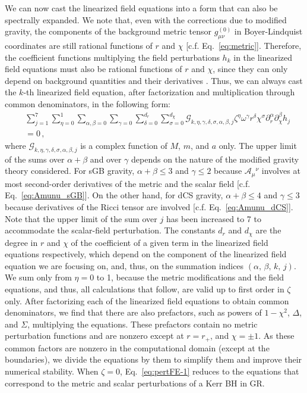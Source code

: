 \documentclass[aps,prx,amsmath,floats,floatfix,twocolumn,
  superscriptaddress,nofootinbib,showpacs]{revtex4-1}
\begin{document}
We can now cast the linearized field equations into a form that can also be spectrally expanded. 
We note that, even with the corrections due to modified gravity, the components of the background metric tensor $g_{\mu\nu}^{(0)}$ in Boyer-Lindquist coordinates are still rational functions of $r$ and $\chi$ [c.f. Eq.~\eqref{eq:metric}]. 
Therefore, the coefficient functions multiplying the field perturbations $h_k$ in the linearized field equations must also be rational functions of $r$ and $\chi$, since they can only depend on background quantities and their derivatives \cite{Chung:2023wkd, Chung:2023zdq}. 
Thus, we can always cast the $k$-th linearized field equation, after factorization and multiplication through common denominators, in the following form: 
%
\begin{align}\label{eq:pertFE-1}
& \sum_{j=1}^{7} \sum_{\eta = 0}^{1} \sum_{\alpha, \beta = 0} \sum_{\gamma=0} \sum_{\delta=0}^{d_{r}} \sum_{\sigma=0}^{d_{\chi}} \mathcal{G}_{k, \eta, \gamma, \delta, \sigma, \alpha, \beta, j} \zeta^{\eta} \omega^\gamma r^{\delta} \chi^{\sigma} \partial_{r}^{\alpha} \partial_{\chi}^{\beta} h_j 
\nonumber \\
&= 0 \,,
\end{align}
where $\mathcal{G}_{k, \eta, \gamma, \delta, \sigma, \alpha, \beta, j}$ is a complex function of $M$, $m$, and $a$ only.
The upper limit of the sums over $\alpha+\beta$ and over $\gamma$ depends on the nature of the modified gravity theory considered. 
For sGB gravity, $\alpha+\beta \leq 3 $ and $\gamma \leq 2 $ because $\mathscr{A}_{\mu} {}^{\nu}$ involves at most second-order derivatives of the metric and the scalar field [c.f. Eq.~\eqref{eq:Amunu_sGB}]. 
On the other hand, for dCS gravity, $\alpha+\beta \leq 4 $ and $\gamma \leq 3 $ because derivatives of the Ricci tensor are involved [c.f. Eq.~\eqref{eq:Amunu_dCS}]. 
Note that the upper limit of the sum over $j$ has been increased to 7 to accommodate the scalar-field perturbation. 
The constants $d_r$ and $d_\chi$ are the degree in $r$ and $\chi$ of the coefficient of a given term in the linearized field equations respectively, which depend on the component of the linearized field equation we are focusing on, and, thus, on the summation indices $(\alpha,\, \beta, \, k, \, j)$. 
We sum only from $\eta = 0 $ to 1, because the metric modifications and the field equations, and thus, all calculations that follow, are valid up to first order in $\zeta$ only. 
After factorizing each of the linearized field equations to obtain common denominators, we find that there are also prefactors, such as powers of $1-\chi^2$, $\Delta$, and $\Sigma$, multiplying the equations.
These prefactors contain no metric perturbation functions and are nonzero except at $r = r_+$, and $\chi = \pm 1$. 
As these common factors are nonzero in the computational domain (except at the boundaries), we divide the equations by them to simplify them and improve their numerical stability.
When $\zeta = 0$, Eq.~\eqref{eq:pertFE-1} reduces to the equations that correspond to the metric and scalar perturbations of a Kerr BH in GR. 
\end{document}
